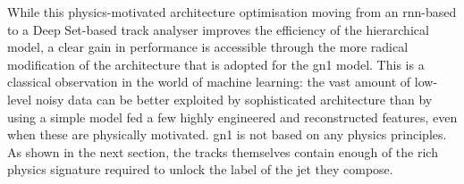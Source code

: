 While this physics-motivated architecture optimisation moving from an \gls{rnn}-based to a Deep Set-based track analyser improves the efficiency of the hierarchical model, a clear gain in performance is accessible through the more radical modification of the architecture that is adopted for the \gls{gn1} model. This is a classical observation in the world of machine learning: the vast amount of low-level noisy data can be better exploited by sophisticated architecture than by using a simple model fed a few highly engineered and reconstructed features, even when these are physically motivated. \gls{gn1} is not based on any physics principles. As shown in the next section, the tracks themselves contain enough of the rich physics signature required to unlock the label of the jet they compose. 